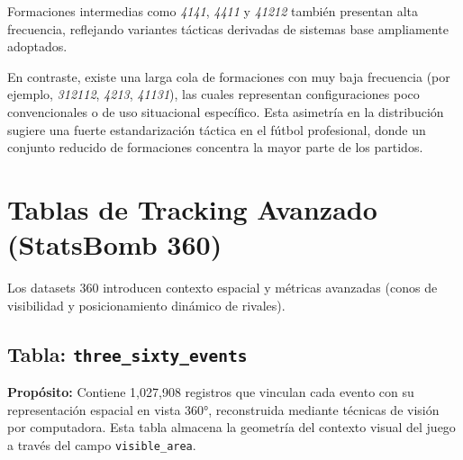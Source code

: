 \documentclass[12pt,a4paper]{article}
\begin{document}
Formaciones intermedias como \textit{4141}, \textit{4411} y \textit{41212} también presentan alta frecuencia, reflejando variantes tácticas derivadas de sistemas base ampliamente adoptados.

En contraste, existe una larga cola de formaciones con muy baja frecuencia (por ejemplo, \textit{312112}, \textit{4213}, \textit{41131}), las cuales representan configuraciones poco convencionales o de uso situacional específico. Esta asimetría en la distribución sugiere una fuerte estandarización táctica en el fútbol profesional, donde un conjunto reducido de formaciones concentra la mayor parte de los partidos.


\newpage
\section{Tablas de Tracking Avanzado (StatsBomb 360)}

Los datasets 360 introducen contexto espacial y métricas avanzadas (conos de visibilidad y posicionamiento dinámico de rivales).
\subsection{Tabla: \texttt{three\_sixty\_events}}

\textbf{Propósito:} Contiene 1,027,908 registros que vinculan cada evento con su representación espacial en vista 360°, reconstruida mediante técnicas de visión por computadora. Esta tabla almacena la geometría del contexto visual del juego a través del campo \texttt{visible\_area}.
\end{document}
